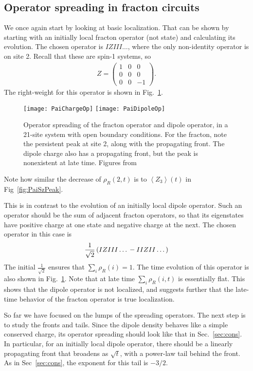 \documentclass[a4paper,11pt]{article}
\renewcommand{\th}[1]{\frac{1}{#1}}
\newcommand{\ex}[1]{\left\langle #1 \right\rangle}
\begin{document}
\subsection{Operator spreading in fracton circuits} \label{sub:fracopsp}

We once again start by looking at basic localization. That can be shown by starting with an initially local fracton operator (not state) and calculating its evolution. The chosen operator is $IZIII\dots$, where the only non-identity operator is on site 2. Recall that these are spin-1 systems, so 
\begin{align}
Z = \begin{pmatrix} 1 & 0 & 0 \\ 0 & 0 & 0 \\ 0 & 0 & -1 \end{pmatrix}.
\end{align}
The right-weight for this operator is shown in Fig.~\ref{fig:PaiChargeOp}.
\begin{figure}
	\centering
	\texttt{[image: PaiChargeOp]}
	\texttt{[image: PaiDipoleOp]}
	\caption{Operator spreading of the fracton operator and dipole operator, in a 21-site system with open boundary conditions. For the fracton, note the persistent peak at site 2, along with the propagating front. The dipole charge also has a propagating front, but the peak is nonexistent at late time. Figures from~\cite{PaiFracton}}
	\label{fig:PaiChargeOp}
\end{figure}
Note how similar the decrease of $\rho_R(2,t)$ is to $\ex{Z_3}(t)$ in Fig~\ref{fig:PaiSzPeak}.

This is in contrast to the evolution of an initially local dipole operator. Such an operator should be the sum of adjacent fracton operators, so that its eigenstates have positive charge at one state and negative charge at the next. The chosen operator in this case is 
\begin{align}
\th{\sqrt{2}}\left(IZIII\dots \vphantom{j}-IIZII\dots\right)
\end{align}
The initial $\th{\sqrt{2}}$ ensures that $\sum_i\rho_R(i)=1$. The time evolution of this operator is also shown in Fig.~\ref{fig:PaiChargeOp}. Note that at late time $\sum_i\rho_R(i, t)$ is essentially flat. This shows that the dipole operator is not localized, and suggests further that the late-time behavior of the fracton operator is true localization. 

So far we have focused on the lumps of the spreading operators. The next step is to study the fronts and tails. Since the dipole density behaves like a simple conserved charge, its operator spreading should look like that in Sec.~\ref{sec:cons}. In particular, for an initially local dipole operator, there should be a linearly propagating front that broadens as $\sqrt{t}$, with a power-law tail behind the front. As in Sec~\ref{sec:cons}, the exponent for this tail is $-3/2$.
\end{document}
